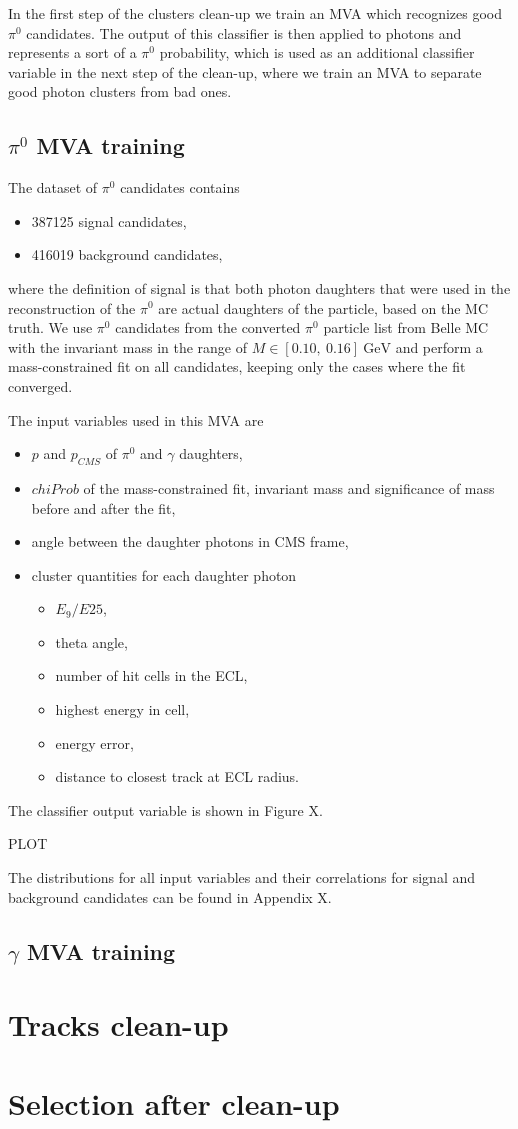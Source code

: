 \documentclass[oneside,a4paper,openany,12pt]{scrbook}
\newcommand {\e}[1]{\mathrm{~#1}}
\begin{document}
In the first step of the clusters clean-up we train an MVA which recognizes good $\pi^0$ candidates. The output of this classifier is then applied to photons and represents a sort of a $\pi^0$ probability, which is used as an additional classifier variable in the next step of the clean-up, where we train an MVA to separate good photon clusters from bad ones.

\subsection{$\pi^0$ MVA training}

The dataset of $\pi^0$ candidates contains
\begin{itemize}
\item 387125 signal candidates,
\item 416019 background candidates,
\end{itemize}
where the definition of signal is that both photon daughters that were used in the reconstruction of the $\pi^0$ are actual daughters of the particle, based on the MC truth. We use $\pi^0$ candidates from the converted $\pi^0$ particle list from Belle MC with the invariant mass in the range of $M \in [0.10,~0.16]\e{GeV}$ and perform a mass-constrained fit on all candidates, keeping only the cases where the fit converged. 


The input variables used in this MVA are
\begin{itemize}
\item $p$ and $p_{CMS}$ of $\pi^0$ and $\gamma$ daughters,
\item $chiProb$ of the mass-constrained fit, invariant mass and significance of mass before and after the fit,
\item angle between the daughter photons in CMS frame,
\item cluster quantities for each daughter photon
	\begin{itemize}
	\item $E_9/E{25}$,
	\item theta angle,
	\item number of hit cells in the ECL,
	\item highest energy in cell,
	\item energy error,
	\item distance to closest track at ECL radius.
	\end{itemize}
\end{itemize}

The classifier output variable is shown in Figure X.

\begin{center}
PLOT
\end{center}

The distributions for all input variables and their correlations for signal and background candidates can be found in Appendix X.


\subsection{$\gamma$ MVA training}


\section{Tracks clean-up}


\section{Selection after clean-up}
\end{document}
